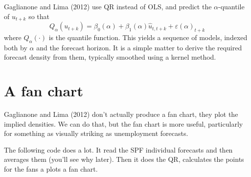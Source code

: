 \documentclass[
  letterpaper,
]{book}
\begin{document}
Gaglianone and Lima (2012) use QR instead of OLS, and predict the
\(\alpha\)-quantile of \(u_{t+k}\) so that \[
  Q_\alpha(u_{t+k}) = \beta_0(\alpha) + \beta_1(\alpha) \hat u_{t,t+k} + \varepsilon{(\alpha)}_{t+k}
\] where \(Q_\alpha(\cdot)\) is the quantile function. This yields a
sequence of models, indexed both by \(\alpha\) and the forecast horizon.
It is a simple matter to derive the required forecast density from them,
typically smoothed using a kernel method.

\hypertarget{a-fan-chart}{%
\section{A fan chart}\label{a-fan-chart}}

Gaglianone and Lima (2012) don't actually produce a fan chart, they plot
the implied densities. We can do that, but the fan chart is more useful,
particularly for something as visually striking as unemployment
forecasts.

The following code does a lot. It read the SPF individual forecasts and
then averages them (you'll see why later). Then it does the QR,
calculates the points for the fans a plots a fan chart.
\end{document}
